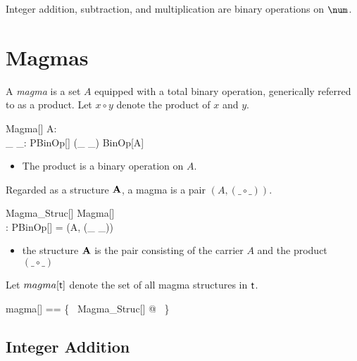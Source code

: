 \documentclass{amsart}
\begin{document}
\begin{example} Integer addition, subtraction, and multiplication are binary operations on $\num$.


\end{example}

\section{Magmas}

A \textit{magma} is a set $A$ equipped with a total binary operation, generically referred to as a product.
Let $x \circ y$ denote the product of $x$ and $y$.

\begin{schema}{Magma}[\genT]
	A: \power \genT \\
	\_ \circ \_: PBinOp[\genT]
\where
	(\_ \circ \_) \in BinOp[A]
\end{schema}

\begin{itemize}
	\item The product is a binary operation on $A$.
\end{itemize}

Regarded as a structure $\mathbf{A}$, a magma is a pair $(A, (\_ \circ \_))$.

\begin{schema}{Magma\_Struc}[\genT]
	Magma[\genT] \\
	\strucA: \power \genT \cross PBinOp[\genT]
\where
	\strucA = (A, (\_ \circ \_))
\end{schema}

\begin{itemize}
	\item the structure $\mathbf{A}$ is the pair consisting of the carrier $A$ and the product $(\_ \circ \_)$
\end{itemize}


Let $magma[\mathsf{t}]$ denote the set of all magma structures in $\mathsf{t}$.
\begin{zed}
	magma[\genT] == \{~ Magma\_Struc[\genT] @ \strucA ~\}
\end{zed}

\subsection{Integer Addition}
\end{document}
